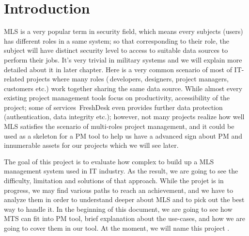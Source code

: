 
\chapter{Introduction} %

\label{ch:introduction} %


MLS is a very popular term in security field, which means every subjects (\ie users) has different roles in a same system;
so that corresponding to their role, the subject will have distinct security level to access to suitable data sources to perform their jobs.
It's very trivial in military systems and we will explain more detailed about it in later chapter.
Here is a very common scenario of most of IT-related projects where many roles (\eg\,developers, designers, project managers, customers etc.) work together sharing the same data source.
While almost every existing project management tools focus on productivity, accessibility of the project;
some of services \eg\,FreshDesk even provides further data protection (authentication, data integrity etc.);
however, not many projects realize how well MLS satisfies the scenario of multi-roles project management, and it could be used as a skeleton for a PM tool to help us have a advanced sign about PM and innumerable assets for our projects which we will see later.

The goal of this project is to evaluate how complex to build up a MLS management system used in IT industry.
As the result, we are going to see the difficulty, limitation and solutions of that approach.
While the projet is in progress, we may find various paths to reach an achievement, and we have to analyze them in order to understand deeper about MLS and to pick out the best way to handle it.
In the beginning of this document, we are going to see how MTS can fit into PM tool, brief explanation about the use-cases, and how we are going to cover them in our tool.
At the moment, we will name this project \myProject.


